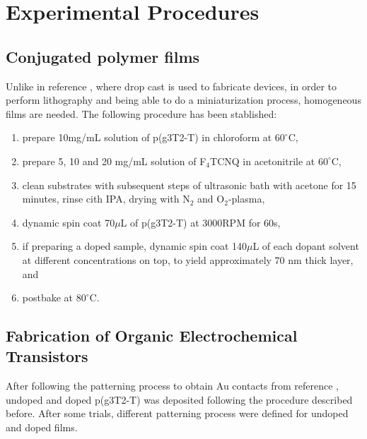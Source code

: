 \section{Experimental Procedures}
\subsection{Conjugated polymer films}
Unlike in reference \cite{tan_tuning_2022}, where drop cast is used to fabricate devices, in order to perform lithography and
being able to do a miniaturization process, homogeneous films are needed. The following procedure
has been stablished:

\begin{enumerate}
\item prepare 10mg/mL solution of p(g3T2-T) in chloroform at $60^{\circ}$C,
\item prepare 5, 10 and 20 mg/mL solution of F$_{4}$TCNQ in acetonitrile at $60^{\circ}$C,
\item clean substrates with subsequent steps of ultrasonic bath with acetone for 15 minutes, rinse cith IPA, drying with N$_{2}$ and O$_{2}$-plasma,
\item dynamic spin coat 70$\mu$L of p(g3T2-T) at 3000RPM for 60s,
\item if preparing a doped sample, dynamic spin coat 140$\mu$L of each dopant solvent at different concentrations on top, to yield approximately 70 nm thick layer, and
\item postbake at $80^{\circ}$C.
\end{enumerate}


\subsection{Fabrication of Organic Electrochemical Transistors}
After following the patterning process to obtain Au contacts from reference , undoped and doped
p(g3T2-T) was deposited following the procedure described before. After some trials, different patterning process were defined for undoped and doped films.

